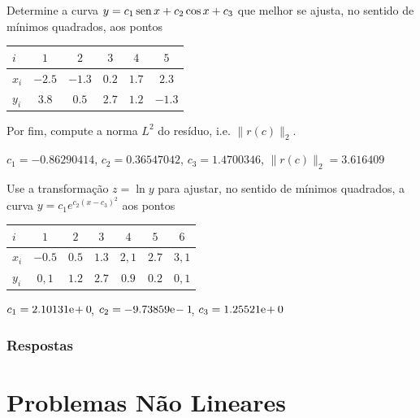 \begin{exer}
  Determine a curva $y = c_1\operatorname{sen} x + c_2\cos x + c_3$ que melhor se ajusta, no sentido de mínimos quadrados, aos pontos
  \begin{center}
    \begin{tabular}{l|ccccc}
      $i$ & $1$ & $2$ & $3$ & $4$ & $5$ \\\hline
      $x_i$ & $-2.5$ & $-1.3$ & $0.2$ & $1.7$ & $2.3$\\
      $y_i$ & $3.8$ & $0.5$ & $2.7$ & $1.2$ & $-1.3$\\\hline
    \end{tabular}
  \end{center}
Por fim, compute a norma $L^2$ do resíduo, i.e. $\|r(c)\|_2$.
\end{exer}
\begin{resp}
  $c_1 = -0.86290414$, $c_2 = 0.36547042$, $c_3 = 1.4700346$, $\|r(c)\|_2 = 3.616409$
\end{resp}

\begin{exer}
  Use a transformação $z = \ln y$ para ajustar, no sentido de mínimos quadrados, a curva $y = c_1e^{c_2(x-c_3)^2}$ aos pontos
  \begin{center}
    \begin{tabular}{l|cccccc}
      $i$ & $1$ & $2$ & $3$ & $4$ & $5$ & $6$ \\\hline
      $x_i$ & $-0.5$ & $0.5$ & $1.3$ & $2,1$ & $2.7$ & $3,1$ \\
      $y_i$ & $0,1$ & $1.2$ & $2.7$ & $0.9$ & $0.2$ & $0,1$ \\\hline
    \end{tabular}
  \end{center}
\end{exer}
\begin{resp}
  $c_1 = 2.10131\mathrm{e}\!+0\!$, $c_2 = -9.73859\mathrm{e}\!-1\!$, $c_3 = 1.25521\mathrm{e}\!+0\!$
\end{resp}

\ifisbook
\subsubsection{Respostas}
\shipoutAnswer
\fi

   
\section{Problemas Não Lineares}\label{cap_ajuste_sec_prob_nlin}
\badgeRevisar

